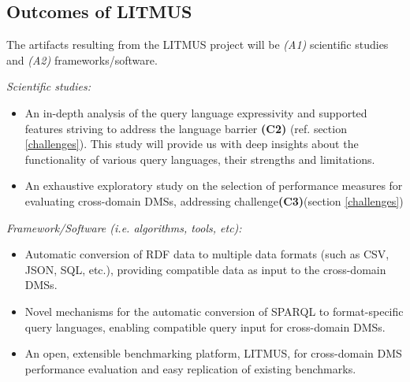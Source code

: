 \documentclass{llncs}
\begin{document}
    \subsection{Outcomes of LITMUS}\label{outcomes}
    The artifacts resulting from the LITMUS project will be \textit{(A1)} scientific studies and \textit{(A2)} frameworks/software. 
    
    \textit{Scientific studies:} 
        \begin{itemize}[nosep]
            \item An in-depth analysis of the query language expressivity and supported features striving to address the language barrier \textbf{(C2)} (ref. section \ref{challenges}). This study will provide us with deep insights about the functionality of various query languages, their strengths and limitations.
            \item An exhaustive exploratory study on the selection of performance measures for evaluating cross-domain DMSs, addressing challenge\textbf{(C3)}(section \ref{challenges})
        \end{itemize}
        
         \textit{Framework/Software (i.e. algorithms, tools, etc):} 
        \begin{itemize}[nosep]
            \item Automatic conversion of RDF data to multiple data formats (such as CSV, JSON, SQL, etc.), providing compatible data as input to the cross-domain DMSs. 
            \item Novel mechanisms for the automatic conversion of SPARQL to format-specific query languages, enabling compatible query input for cross-domain DMSs.
            \item An open, extensible benchmarking platform, LITMUS, for cross-domain DMS performance evaluation and easy replication of existing benchmarks.
       \end{itemize}       
\end{document}
